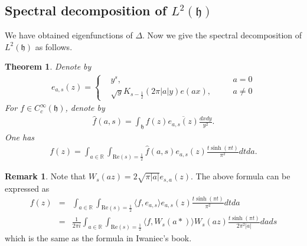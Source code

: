 \documentclass[11pt,reqno]{amsart}
\newcommand{\bna}{\begin{eqnarray*}}
\newcommand{\ena}{\end{eqnarray*}}
\newcommand{\mk}{\mathfrak}
\def\re{{\mathrm{Re}}}
\def\R{\mathbb{R}}
\newtheorem{thm}[lemma]{Theorem}
\theoremstyle{definition}
\newtheorem{remark}{Remark}
\begin{document}
\subsection{Spectral decomposition of $L^2(\mk h)$}
We have obtained  eigenfunctions of $\Delta$. Now we give the
spectral decomposition of $L^2(\mk h)$ as follows.
\begin{thm}
Denote by
\bna
e_{a,s}(z)=
\left\{
\begin{aligned}
&y^s,\qquad &&a=0\\
&\sqrt{y}K_{s-\frac{1}{2}}(2\pi |a|y) e(ax),\quad &&a\neq 0
\end{aligned}
\right.
\ena
For  $f\in C_c^\infty(\mk h)$, denote by
\bna
\widehat f(a,s)=\int_{\mk h}f(z)\overline{e_{a,s}(z)}\frac{dxdy}{y^2}.
\ena
One has
\bna
f(z)=\int_{a\in \R}\int_{\re(s)=\frac{1}{2}}\widehat f(a,s) e_{a,s}(z)\frac{t\sinh(\pi t)}{\pi^2}dtda.
\ena
\end{thm}
\begin{remark}
Note that $W_s(az)=2\sqrt{\pi|a|} e_{s,a}(z)$. The above formula can be expressed as
\bna
f(z)&=&
\int_{a\in \R}\int_{\re(s)=\frac{1}{2}}
\langle f,e_{a,s}\rangle e_{a,s}(z) \frac{t\sinh(\pi t)}{\pi^2}dtda\\
&=&\frac{1}{2\pi i}
\int_{a\in \R}\int_{\re(s)=\frac{1}{2}}
\langle f,W_{s}(a*)\rangle W_s(az) \frac{t\sinh(\pi t)}{2\pi^2|a|}dads
\ena
which is the same as the formula in Iwaniec's book.

\end{remark}
\end{document}
